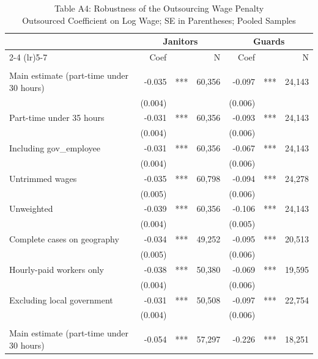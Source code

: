 \begin{table}[!t]
\caption*{
{\large Table A4: Robustness of the Outsourcing Wage Penalty} \\
{\small Outsourced Coefficient on Log Wage; SE in Parentheses; Pooled Samples}
} 

\fontsize{10.0pt}{12.0pt}\selectfont

\centering\begin{tabular}{l|rlrrlr}
\toprule
  & \multicolumn{3}{c}{Janitors} & \multicolumn{3}{c}{Guards} \\ 
\cmidrule(lr){2-4} \cmidrule(lr){5-7}
  & Coef &  & N & Coef &  & N \\ 
\midrule\addlinespace[2.5pt]
\multicolumn{7}{l}{2001-2025} \\[2.5pt] 
\midrule\addlinespace[2.5pt]
Main estimate (part-time under 30 hours) & -0.035 & *** & 60,356 & -0.097 & *** & 24,143 \\
 & (0.004) &  &  & (0.006) &  &  \\
Part-time under 35 hours & -0.031 & *** & 60,356 & -0.093 & *** & 24,143 \\
 & (0.004) &  &  & (0.006) &  &  \\
Including gov\_employee & -0.031 & *** & 60,356 & -0.067 & *** & 24,143 \\
 & (0.004) &  &  & (0.006) &  &  \\
Untrimmed wages & -0.035 & *** & 60,798 & -0.094 & *** & 24,278 \\
 & (0.005) &  &  & (0.006) &  &  \\
Unweighted & -0.039 & *** & 60,356 & -0.106 & *** & 24,143 \\
 & (0.004) &  &  & (0.005) &  &  \\
Complete cases on geography & -0.034 & *** & 49,252 & -0.095 & *** & 20,513 \\
 & (0.005) &  &  & (0.006) &  &  \\
Hourly-paid workers only & -0.038 & *** & 50,380 & -0.069 & *** & 19,595 \\
 & (0.004) &  &  & (0.006) &  &  \\
Excluding local government & -0.031 & *** & 50,508 & -0.097 & *** & 22,754 \\
 & (0.004) &  &  & (0.006) &  &  \\
\midrule\addlinespace[2.5pt]
\multicolumn{7}{l}{1983-2000} \\[2.5pt] 
\midrule\addlinespace[2.5pt]
Main estimate (part-time under 30 hours) & -0.054 & *** & 57,297 & -0.226 & *** & 18,251 \\

\end{tabular}
\end{table}

